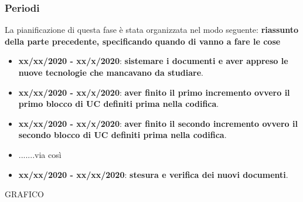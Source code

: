 \subsubsection{Periodi}
La pianificazione di questa fase è stata organizzata nel modo seguente:
\textbf{riassunto della parte precedente, specificando quando di vanno a fare le cose}
\begin{itemize}
\item \textbf{xx/xx/2020 - xx/x/2020}: \textbf{sistemare i documenti e aver appreso le nuove tecnologie che mancavano da studiare}.

\item \textbf{xx/xx/2020 - xx/x/2020}: \textbf{aver finito il primo incremento ovvero il primo blocco di UC definiti prima nella codifica}.

\item \textbf{xx/xx/2020 - xx/x/2020}: \textbf{aver finito il secondo incremento ovvero il secondo blocco di UC definiti prima nella codifica}.

\item .......via così

\item \textbf{xx/xx/2020 - xx/xx/2020}: \textbf{stesura e verifica dei nuovi documenti}.
\end{itemize}


GRAFICO